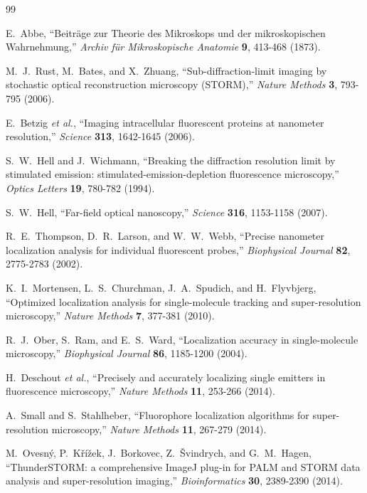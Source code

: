 \documentclass[11pt,a4paper]{article}
\begin{document}
\begin{thebibliography}{99}

 E.~Abbe, ``Beitr\"age zur Theorie des Mikroskops und der
  mikroskopischen Wahrnehmung,'' \textit{Archiv f\"ur Mikroskopische Anatomie}
  \textbf{9}, 413-468 (1873).

 M.~J.~Rust, M.~Bates, and X.~Zhuang, ``Sub-diffraction-limit
  imaging by stochastic optical reconstruction microscopy (STORM),''
  \textit{Nature Methods} \textbf{3}, 793-795 (2006).

 E.~Betzig \textit{et al.}, ``Imaging intracellular
  fluorescent proteins at nanometer resolution,'' \textit{Science} \textbf{313},
  1642-1645 (2006).

 S.~W.~Hell and J.~Wichmann, ``Breaking the diffraction
  resolution limit by stimulated emission: stimulated-emission-depletion
  fluorescence microscopy,'' \textit{Optics Letters} \textbf{19}, 780-782
  (1994).

 S.~W.~Hell, ``Far-field optical nanoscopy,''
  \textit{Science} \textbf{316}, 1153-1158 (2007).

 R.~E.~Thompson, D.~R.~Larson, and W.~W.~Webb, ``Precise
  nanometer localization analysis for individual fluorescent probes,''
  \textit{Biophysical Journal} \textbf{82}, 2775-2783 (2002).

 K.~I.~Mortensen, L.~S.~Churchman, J.~A.~Spudich, and
  H.~Flyvbjerg, ``Optimized localization analysis for single-molecule tracking
  and super-resolution microscopy,'' \textit{Nature Methods} \textbf{7},
  377-381 (2010).

 R.~J.~Ober, S.~Ram, and E.~S.~Ward, ``Localization accuracy
  in single-molecule microscopy,'' \textit{Biophysical Journal} \textbf{86},
  1185-1200 (2004).

 H.~Deschout \textit{et al.}, ``Precisely and accurately
  localizing single emitters in fluorescence microscopy,'' \textit{Nature
  Methods} \textbf{11}, 253-266 (2014).

 A.~Small and S.~Stahlheber, ``Fluorophore localization
  algorithms for super-resolution microscopy,'' \textit{Nature Methods}
  \textbf{11}, 267-279 (2014).

 M.~Ovesn\'y, P.~K\v{r}\'i\v{z}ek, J.~Borkovec,
  Z.~\v{S}vindrych, and G.~M.~Hagen, ``ThunderSTORM: a comprehensive ImageJ
  plug-in for PALM and STORM data analysis and super-resolution imaging,''
  \textit{Bioinformatics} \textbf{30}, 2389-2390 (2014).


\end{thebibliography}
\end{document}
